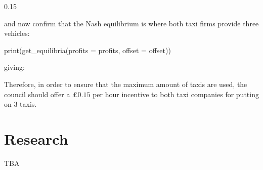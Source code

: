 \begin{Rout}
[1] 0.15
\end{Rout}

and now confirm that the Nash equilibrium is where both taxi firms provide
three vehicles:

\begin{Rin}
print(get_equilibria(profits = profits, offset = offset))
\end{Rin}

giving:


Therefore, in order to ensure that the maximum amount of taxis are used, the
council should offer a \(\pounds 0.15\) per hour incentive to both taxi
companies for putting on 3 taxis.

\section{Research}\label{sec:research}

TBA
